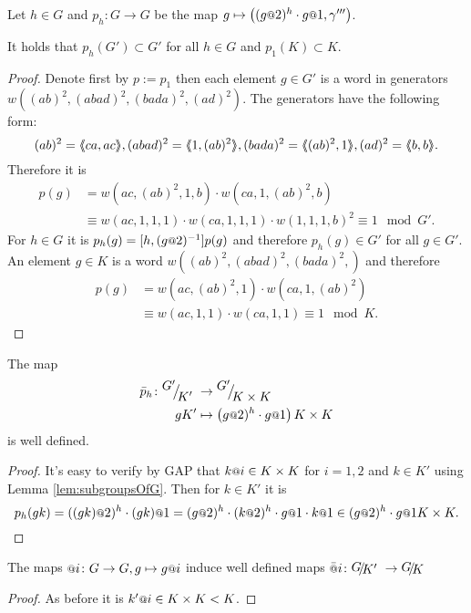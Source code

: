 \documentclass[a4paper,12pt]{article}
\begin{document}
\begin{lem} \label{lem:productOfStatesIsInDerived} 
 Let $h\in G$ and $p_h\colon G\to G$ be the map $g\mapsto \left((g\at{2})^{h}\cdot g\at{1},\gamma'''\right)$.
 
 It holds that $p_h(G')\subset G'$ for all $h\in G$ and $p_1(K)\subset K$. 
\end{lem}
\begin{proof}
 Denote first by $p:=p_1$ then
 each element $g\in G'$ is a word in generators $w((ab)^2,(abad)^2,(bada)^2,(ad)^2)$. 
 The generators have the following form:
 \[(ab)^2=\pair{ca,ac}, (abad)^2 = \pair{1,(ab)^2}, (bada)^2=\pair{(ab)^2,1}, (ad)^2=\pair{b,b}.\]
 Therefore it is
 \begin{align*}
  p(g) &= w(ac,(ab)^2,1,b) \cdot w(ca,1,(ab)^2,b)\\ &\equiv w(ac,1,1,1) \cdot w(ca,1,1,1) \cdot w(1,1,1,b)^2 \equiv 1 \mod G'.
 \end{align*}
 For $h\in G$ it is $p_h(g)=[h,(g\at{2})^{-1}]p(g)$ and therefore $p_h(g)\in G'$ for all $g\in G'$.
 An element $g\in K$ is a word $w((ab)^2,(abad)^2,(bada)^2,)$ and therefore
 \begin{align*}
  p(g) &= w(ac,(ab)^2,1) \cdot w(ca,1,(ab)^2)\\ &\equiv w(ac,1,1) \cdot w(ca,1,1) \equiv 1 \mod K.
 \end{align*}
\end{proof}
\begin{lem} \label{lem:pIsDefinedModK'}
 The map 
 \begin{align*} 
  \bar p_h\colon \RNK{G'}{K'} &\to \RNK{G'}{K\times K}\\
  gK'&\mapsto \left(g\at{2})^h\cdot g\at{1}\right){K\times K}
 \end{align*}
is well defined.
\end{lem}
\begin{proof}
 It's easy to verify by GAP that $k\at{i} \in K\times K$ for $i=1,2$ and $k\in K'$ using Lemma \ref{lem:subgroupsOfG}.
 Then for $k\in K'$ it is 
 \[p_h(gk) = ((gk)\at{2})^h\cdot (gk)\at{1} = (g\at{2})^h\cdot (k\at{2})^h\cdot g\at{1}\cdot k\at{1}\in (g\at{2})^h\cdot g\at{1}K\times K.\]
\end{proof}
\begin{lem} \label{lem:atIsWellDefinedModK'}
 The maps $\at{i}\colon G\to G, g\mapsto g\at{i}$ induce well defined maps $\att{i}\colon \RNK{G}{K'}\to\RNK{G}{K}$
\end{lem}
\begin{proof}
 As before it is $k'\at{i} \in K\times K < K$.
%  
%  
% 
\end{proof}
\end{document}
